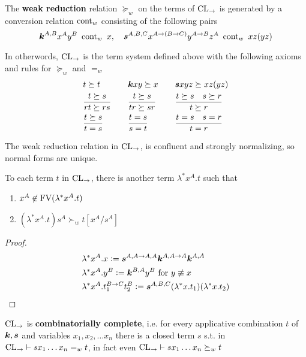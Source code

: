 \documentclass[11pt]{article}
\begin{document}
\begin{definition}[]
The \textbf{weak reduction} relation \(\succeq_w\) on the terms of \(\operatorname{CL}_\to\) is
generated by a conversion relation \(\text{cont}_w\) consisting of the following
pairs
\begin{equation*}
\boldsymbol{k}^{A,B}x^Ay^B\enspace\text{cont}_w\enspace x,\quad\boldsymbol{s}^{A,B,C}x^{A\to(B\to C)}y^{A\to B}z^A
\enspace\text{cont}_w\enspace xz(yz)
\end{equation*}

In otherwords, \(\operatorname{CL}_\to\) is the term system defined above with the following
axioms and rules for \(\succeq_w\) and \(=_w\)
\begin{alignat*}{3}
&t\succeq t&&\boldsymbol{k} xy\succeq x\quad&&\boldsymbol{s} xyz\succeq xz(yz)\\
&\frac{t\succeq s}{rt\succeq rs}\quad&&\frac{t\succeq s}{tr\succeq sr}&&
\frac{t\succeq s\quad s\succeq r}{t\succeq r}\\
&\frac{t\succeq s}{t=s}&&\frac{t=s}{s=t}&&\frac{t=s\quad s=r}{t=r}
\end{alignat*}
\end{definition}

\begin{theorem}[]
The weak reduction relation in \(\operatorname{CL}_\to\), is confluent and
strongly normalizing, so normal forms are unique.
\end{theorem}

\begin{theorem}[]
To each term \(t\) in \(\operatorname{CL}_\to\), there is another term \(\lambda^*x^A.t\) such
that
\begin{enumerate}
\item \(x^A\not\in\text{FV}(\lambda^*x^A.t)\)
\item \((\lambda^*x^A.t)s^A\succ_wt[x^A/s^A]\)
\end{enumerate}
\end{theorem}
\begin{proof}
\begin{align*}
&\lambda^*x^A.x:=\boldsymbol{s}^{A,A\to A,A}\boldsymbol{k}^{A,A\to A}\boldsymbol{k}^{A,A}\\
&\lambda^*x^A.y^B:=\boldsymbol{k}^{B,A}y^B\text{ for }y\not\equiv x\\
&\lambda^*x^A.t_1^{B\to C}t_2^B:=\boldsymbol{s}^{A,B,C}(\lambda^*x.t_1)(\lambda^*x.t_2)
\end{align*}
\end{proof}

\begin{corollary}[]
\(\operatorname{CL}_\to\) is \textbf{combinatorially complete}, i.e. for every applicative
combination \(t\) of \(\boldsymbol{k},\boldsymbol{s}\) and variables \(x_1,x_2,\dots x_n\) there is a
closed term \(s\) s.t. in \(\operatorname{CL}_\to\vdash sx_1\dots x_n=_w t\), in fact even
\(\operatorname{CL}_\to\vdash sx_1\dots x_n\succeq_w t\)
\end{corollary}
\end{document}
